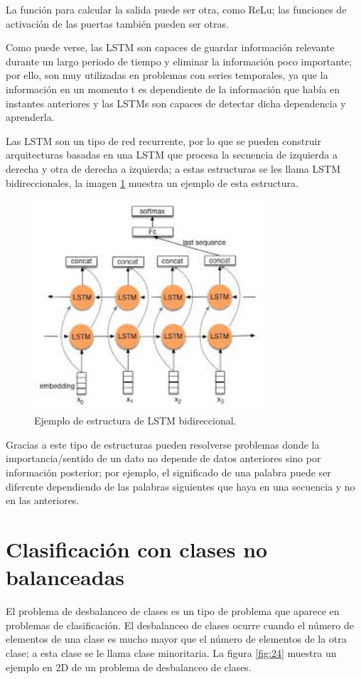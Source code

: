 La función para calcular la salida puede ser otra, como ReLu; las funciones de activación de las puertas también pueden ser otras.\newline

Como puede verse, las LSTM son capaces de guardar información relevante durante un largo periodo de tiempo y eliminar la información poco importante; por ello, son muy utilizadas en problemas con series temporales, ya que la información en un momento t es dependiente de la información que había en instantes anteriores y las LSTMs son capaces de detectar dicha dependencia y aprenderla.\newline

Las LSTM son un tipo de red recurrente, por lo que se pueden construir arquitecturas basadas en una LSTM que procesa la secuencia de izquierda a derecha y otra de derecha a izquierda; a estas estructuras se les llama LSTM bidireccionales, la imagen \ref{fig:23} muestra un ejemplo de esta estructura.\newline
\newpage

\begin{figure}[H]
	\centering
	\includegraphics[width=85mm]{imagenes/bidi-lstm.jpg}
	\caption{Ejemplo de estructura de LSTM bidireccional.}
	\label{fig:23}
\end{figure}
\verticalspace
Gracias a este tipo de estructuras pueden resolverse problemas donde la importancia/sentido de un dato no depende de datos anteriores sino por información posterior; por ejemplo, el significado de una palabra puede ser diferente dependiendo de las palabras siguientes que haya en una secuencia y no en las anteriores.
\newpage
\section{Clasificación con clases no balanceadas}
El problema de desbalanceo de clases es un tipo de problema que aparece en problemas de clasificación. El desbalanceo de clases ocurre cuando el número de elementos de una clase es mucho mayor que el número de elementos de la otra clase; a esta clase se le llama clase minoritaria. La figura \ref{fig:24} muestra un ejemplo en 2D de un problema de desbalanceo de clases.\newline

